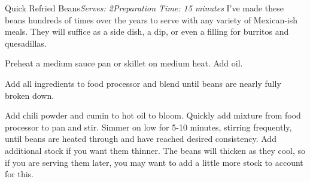 \documentclass{article}
\begin{document}
\begin{recipe}{Quick Refried Beans}{\textit{Serves: 2}}{\textit{Preparation Time: 15 minutes}}
    \freeform
    I've made these beans hundreds of times over the years to serve with any variety of Mexican-ish meals. They will suffice as a side dish, a dip, or even a filling for burritos and quesadillas.


    Preheat a medium sauce pan or skillet on medium heat. Add oil.


    Add all ingredients to food processor and blend until beans are nearly fully broken down.


    Add chili powder and cumin to hot oil to bloom. Quickly add mixture from food processor to pan and stir. Simmer on low for 5-10 minutes, stirring frequently, until beans are heated through and have reached desired consistency. Add additional stock if you want them thinner. The beans will thicken as they cool, so if you are serving them later, you may want to add a little more stock to account for this.
\end{recipe}
\end{document}
